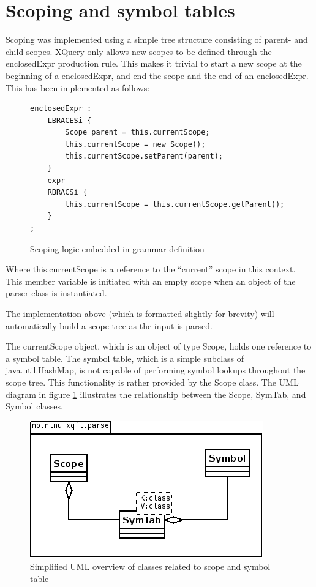\section{Scoping and symbol tables}
Scoping was implemented using a simple tree structure consisting of parent- and
child scopes. XQuery only allows new scopes to be defined through the
enclosedExpr production rule. This makes it trivial to start a new scope at the
beginning of a enclosedExpr, and end the scope and the end of an enclosedExpr.
This has been implemented as follows:
\begin{figure}[!h]
\begin{verbatim}
enclosedExpr : 
    LBRACESi {
        Scope parent = this.currentScope; 
        this.currentScope = new Scope(); 
        this.currentScope.setParent(parent); 
    }
    expr 
    RBRACSi { 
        this.currentScope = this.currentScope.getParent(); 
    }
;
\end{verbatim}
\caption{Scoping logic embedded in grammar definition}
\end{figure}

Where this.currentScope is a reference to the ``current'' scope in this
context. This member variable is initiated with an empty scope when an object
of the parser class is instantiated.

The implementation above (which is formatted slightly for brevity) will
automatically build a scope tree as the input is parsed.

The currentScope object, which is an object of type Scope, holds one reference
to a symbol table. The symbol table, which is a simple subclass of
java.util.HashMap, is not capable of performing symbol lookups throughout the
scope tree. This functionality is rather provided by the Scope class. The UML diagram
in figure \ref{fig:scope:uml1} illustrates the relationship between the Scope, SymTab, and Symbol
classes. \clearpage
\begin{figure}[!h]
  \centering
    \includegraphics[scale=0.6]{img/uml1}
  \caption{Simplified UML overview of classes related to scope and symbol table}
  \label{fig:scope:uml1}
\end{figure}

